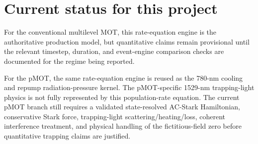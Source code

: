 \documentclass[11pt]{article}
\begin{document}
\section{Current status for this project}

For the conventional multilevel MOT, this rate-equation engine is the
authoritative production model, but quantitative claims remain provisional until
the relevant timestep, duration, and event-engine comparison checks are
documented for the regime being reported.

For the pMOT, the same rate-equation engine is reused as the 780-nm cooling and
repump radiation-pressure kernel.  The pMOT-specific 1529-nm trapping-light
physics is not fully represented by this population-rate equation.  The current
pMOT branch still requires a validated state-resolved AC-Stark Hamiltonian,
conservative Stark force, trapping-light scattering/heating/loss, coherent
interference treatment, and physical handling of the fictitious-field zero
before quantitative trapping claims are justified.
\end{document}
